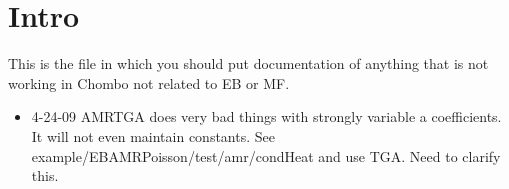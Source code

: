 \section{Intro}

This is the file in which you should put documentation of anything
that is not working in Chombo not related to EB or MF.

\begin{itemize}

\item{4-24-09}  AMRTGA does very bad things with strongly variable a
  coefficients.   It will not even maintain constants.   See 
  example/EBAMRPoisson/test/amr/condHeat and use TGA.  Need to clarify this.

\end{itemize}

